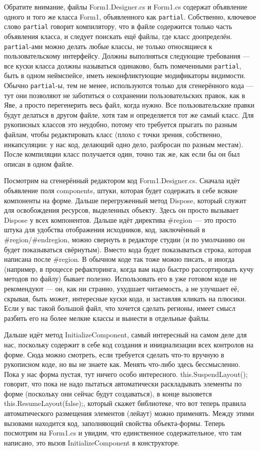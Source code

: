 \documentclass{../../text-style}
\begin{document}
Обратите внимание, файлы Form1.Designer.cs и Form1.cs содержат объявление одного и того же класса Form1, объявленного как \texttt{partial}. Собственно, ключевое слово \texttt{partial} говорит компилятору, что в файле содержится только часть объявления класса, и следует поискать ещё файлы, где класс доопределён. \texttt{partial}-ами можно делать любые классы, не только относящиеся к пользовательскому интерфейсу. Должны выполняться следующие требования --- все куски класса должны называться одинаково, быть помеченными \texttt{partial}, быть в одном неймспейсе, иметь неконфликтующие модификаторы видимости. Обычно \texttt{partial}-ы, тем не менее, используются только для сгенерённого кода --- тут они позволяют не заботиться о сохранении пользовательских правок, как в Яве, а просто перегенерить весь файл, когда нужно. Все пользовательские правки будут делаться в другом файле, хотя там и определяется тот же самый класс. Для рукописных классов это неудобно, потому что требуется прыгать по разным файлам, чтобы редактировать класс (плохо с точки зрения, собственно, инкапсуляции: у нас код, делающий одно дело, разбросан по разным местам). После компиляции класс получается один, точно так же, как если бы он был описан в одном файле.

Посмотрим на сгенерённый редактором код Form1.Designer.cs. Сначала идёт объявление поля components, штуки, которая будет содержать в себе всякие компоненты на форме. Дальше перегруженный метод Dispose, который служит для освобождения ресурсов, выделенных объекту. Здесь он просто вызывает Dispose у всех компонентов. Дальше идёт директива \#region --- это просто штука для удобства отображения исходников, код, заключённый в \#region/\#endregion, можно свернуть в редакторе студии (и по умолчанию он будет показываться свёрнутым). Вместо кода будет показываться строка, которая написана после \#region. В обычном коде так тоже можно писать, и иногда (например, в процессе рефакторинга, когда вам надо быстро рассортировать кучу методов по файлу) бывает полезно. Использовать его в уже готовом коде не рекомендуют --- он, как ни странно, ухудшает читаемость, а не улучшает её, скрывая, быть может, интересные куски кода, и заставляя кликать на плюсики. Если у вас такой большой файл, что хочется сделать регионы, имеет смысл разбить его на более мелкие классы и вынести в отдельные файлы.

Дальше идёт метод InitializeComponent, самый интересный на самом деле для нас, поскольку содержит в себе код создания и инициализации всех контролов на форме. Сюда можно смотреть, если требуется сделать что-то вручную в рукописном коде, но вы не знаете как. Менять что-либо здесь бессмысленно. Пока у нас форма пустая, тут ничего особо интересного. this.SuspendLayout(); говорит, что пока не надо пытаться автоматически раскладывать элементы по форме (поскольку они сейчас будут создаваться), в конце вызовется this.ResumeLayout(false);, который скажет библиотеке, что вот теперь правила автоматического размещения элементов (лейаут) можно применять. Между этими вызовами находится код, заполняющий свойства объекта-формы. Теперь посмотрим на Form1.cs и увидим, что единственное содержательное, что там написано, это вызов InitializeComponent в конструкторе. 
\end{document}
